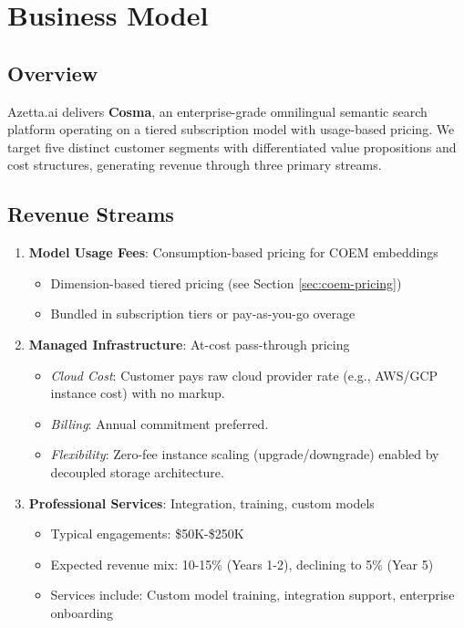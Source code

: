 \section{Business Model}

\subsection{Overview}

Azetta.ai delivers \textbf{Cosma}, an enterprise-grade omnilingual semantic search platform operating on a tiered subscription model with usage-based pricing. We target five distinct customer segments with differentiated value propositions and cost structures, generating revenue through three primary streams.

\subsection{Revenue Streams}

\begin{enumerate}
    \item \textbf{Model Usage Fees}: Consumption-based pricing for COEM embeddings
    \begin{itemize}[noitemsep]
        \item Dimension-based tiered pricing (see Section \ref{sec:coem-pricing})
        \item Bundled in subscription tiers or pay-as-you-go overage
    \end{itemize}
    
    \item \textbf{Managed Infrastructure}: At-cost pass-through pricing
    \begin{itemize}[noitemsep]
        \item \textit{Cloud Cost}: Customer pays raw cloud provider rate (e.g., AWS/GCP instance cost) with no markup.
        \item \textit{Billing}: Annual commitment preferred.
        \item \textit{Flexibility}: Zero-fee instance scaling (upgrade/downgrade) enabled by decoupled storage architecture.
    \end{itemize}
    
    \item \textbf{Professional Services}: Integration, training, custom models
    \begin{itemize}[noitemsep]
        \item Typical engagements: \$50K-\$250K
        \item Expected revenue mix: 10-15\% (Years 1-2), declining to 5\% (Year 5)
        \item Services include: Custom model training, integration support, enterprise onboarding
    \end{itemize}
\end{enumerate}

